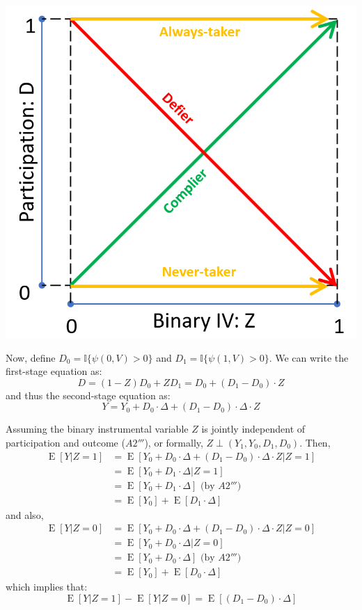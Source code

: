 \documentclass[12pt]{report}
\newcommand{\E}[1]{\operatorname{E}\left[#1\right]}
\begin{document}
\begin{center}
 \includegraphics[scale=0.4]{images/localtreatmentclass.PNG}
\end{center}
 
Now, define $D_0 = \mathbb{I}\{\psi(0,V)>0\}$ and $D_1 = \mathbb{I}\{\psi(1,V)>0\}$. We can write the first-stage equation as: $$D = (1 - Z)D_0 + ZD_1 = D_0 + (D_1 - D_0)\cdot Z $$ and thus the second-stage equation as: $$Y = Y_0 + D_0\cdot \Delta + (D_1 - D_0)\cdot \Delta\cdot Z $$

Assuming the binary instrumental variable $Z$ is jointly independent of participation and outcome ($A2'''$), or formally, $Z\perp (Y_1,Y_0,D_1,D_0)$. Then, \begin{align*}
\E{Y\vert Z=1} & = \E{Y_0 + D_0\cdot \Delta + (D_1 - D_0)\cdot \Delta\cdot Z\vert Z=1} \\
& = \E{Y_0 + D_1\cdot \Delta \vert Z=1} \\
& = \E{Y_0 + D_1\cdot \Delta} \text{ (by } A2''')\\
& = \E{Y_0} + \E{D_1\cdot \Delta}
\end{align*}
and also,
\begin{align*}
\E{Y\vert Z=0} & = \E{Y_0 + D_0\cdot \Delta + (D_1 - D_0)\cdot \Delta\cdot Z\vert Z=0} \\
& = \E{Y_0 + D_0\cdot \Delta 
\vert Z=0} \\
& = \E{Y_0 + D_0\cdot \Delta} \text{ (by } A2''')\\
& = \E{Y_0} + \E{D_0\cdot \Delta}
\end{align*}
which implies that: $$ \E{Y\vert Z=1} - \E{Y\vert Z=0} = \E{(D_1 - D_0)\cdot \Delta} $$
\end{document}
